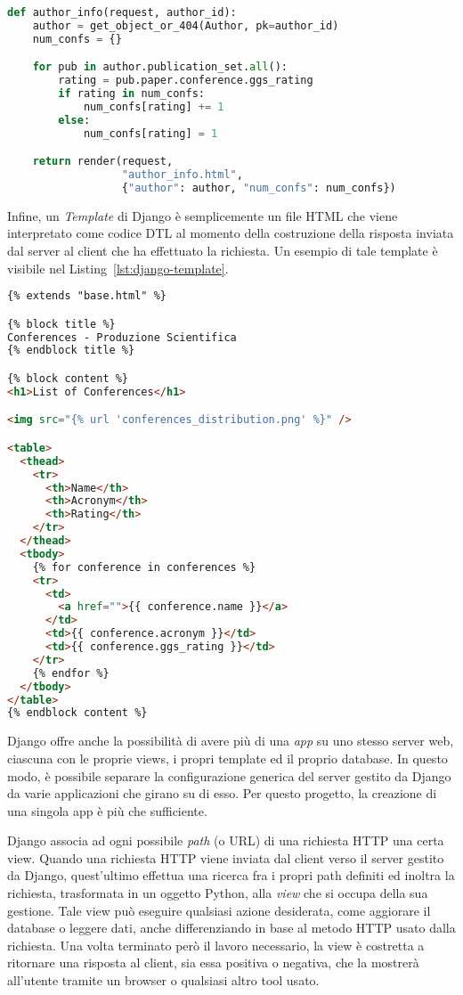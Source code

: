 \begin{lstlisting}[language=Python,caption=La view \texttt{author\_info},label=lst:view-author-info]
def author_info(request, author_id):
    author = get_object_or_404(Author, pk=author_id)
    num_confs = {}

    for pub in author.publication_set.all():
        rating = pub.paper.conference.ggs_rating
        if rating in num_confs:
            num_confs[rating] += 1
        else:
            num_confs[rating] = 1

    return render(request,
                  "author_info.html",
                  {"author": author, "num_confs": num_confs})
\end{lstlisting}

Infine, un \textit{Template} di Django è semplicemente un file HTML che
viene interpretato come codice DTL al momento della costruzione della risposta
inviata dal server al client che ha effettuato la richiesta. Un esempio di tale
template è visibile nel Listing~\ref{lst:django-template}.

\begin{lstlisting}[language=HTML, caption=Template per l'elenco delle conferenze,label=lst:django-template]
{% extends "base.html" %}

{% block title %}
Conferences - Produzione Scientifica
{% endblock title %}

{% block content %}
<h1>List of Conferences</h1>

<img src="{% url 'conferences_distribution.png' %}" />

<table>
  <thead>
    <tr>
      <th>Name</th>
      <th>Acronym</th>
      <th>Rating</th>
    </tr>
  </thead>
  <tbody>
    {% for conference in conferences %}
    <tr>
      <td>
        <a href="">{{ conference.name }}</a>
      </td>
      <td>{{ conference.acronym }}</td>
      <td>{{ conference.ggs_rating }}</td>
    </tr>
    {% endfor %}
  </tbody>
</table>
{% endblock content %}
\end{lstlisting}

Django offre anche la possibilità di avere più di una \textit{app} su uno stesso
server web, ciascuna con le proprie views, i propri template ed il proprio
database. In questo modo, è possibile separare la configurazione generica del
server gestito da Django da varie applicazioni che girano su di esso.
Per questo progetto, la creazione di una singola app è più che sufficiente.

Django associa ad ogni possibile \textit{path} (o URL) di una richiesta HTTP
una certa view. Quando una richiesta HTTP viene inviata dal client verso il
server gestito da Django, quest'ultimo effettua una ricerca fra i propri path
definiti ed inoltra la richiesta, trasformata in un oggetto Python, alla
\textit{view} che si occupa della sua gestione.
Tale view può eseguire qualsiasi azione desiderata, come aggiorare il database o
leggere dati, anche differenziando in base al metodo HTTP usato dalla richiesta.
Una volta terminato però il lavoro necessario, la view è costretta a ritornare
una risposta al client, sia essa positiva o negativa, che la mostrerà all'utente
tramite un browser o qualsiasi altro tool usato.

